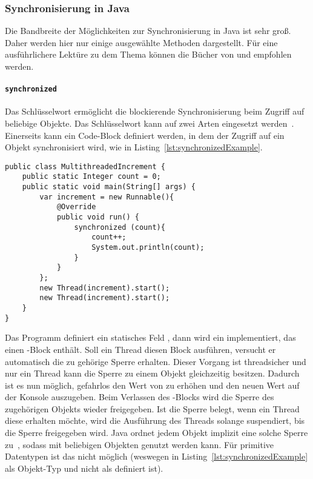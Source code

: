 \subsubsection{Synchronisierung in Java}
Die Bandbreite der Möglichkeiten zur Synchronisierung in Java ist sehr groß. Daher werden hier nur einige ausgewählte Methoden dargestellt. Für eine ausführlichere Lektüre zu dem Thema können die Bücher von \textcite{Friesen2015} und \textcite{Hettel2016} empfohlen werden.

\paragraph{\texttt{synchronized}} Das Schlüsselwort  ermöglicht die blockierende Synchronisierung beim Zugriff auf beliebige Objekte. Das Schlüsselwort kann auf zwei Arten eingesetzt werden~\Cite[S.~339~ff.]{Rauber2006}. Einerseits kann ein Code-Block definiert werden, in dem der Zugriff auf ein Objekt synchronisiert wird, wie in Listing~\ref{lst:synchronizedExample}.
\begin{lstlisting}[caption={[Beispiel eines Java-\glsentryuseri{Programm} mit Nutzung von \code{synchronized}.]Beispiel eines Java-\glsuseri{Programm}, das \code{synchronized} zur Synchronisierung nebenläufiger \glspl{Anweisung} nutzt.}, label={lst:synchronizedExample},float={htbp}]
public class MultithreadedIncrement {
	public static Integer count = 0;
	public static void main(String[] args) {
		var increment = new Runnable(){
			@Override
			public void run() {
				synchronized (count){
					count++;
					System.out.println(count);
				}
			}
		};
		new Thread(increment).start();
		new Thread(increment).start();
	}
}	
\end{lstlisting}
Das \gls{Programm} definiert ein statisches Feld , dann wird ein  implementiert, das einen -Block enthält. Soll ein Thread diesen Block ausführen, versucht er automatisch die zu  gehörige Sperre erhalten. Dieser Vorgang ist threadsicher und nur ein Thread kann die Sperre zu einem Objekt gleichzeitig besitzen. Dadurch ist es nun möglich, gefahrlos den Wert von  zu erhöhen und den neuen Wert auf der Konsole auszugeben. Beim Verlassen des -Blocks wird die Sperre des zugehörigen Objekts wieder freigegeben. Ist die Sperre belegt, wenn ein Thread diese erhalten möchte, wird die Ausführung des Threads solange suspendiert, bis die Sperre freigegeben wird. Java ordnet jedem Objekt implizit eine solche Sperre zu~\cite{Friesen2015}, sodass  mit beliebigen Objekten genutzt werden kann. Für primitive Datentypen ist das nicht möglich (weswegen  in Listing~\ref{lst:synchronizedExample} als Objekt-Typ  und nicht als  definiert ist).

